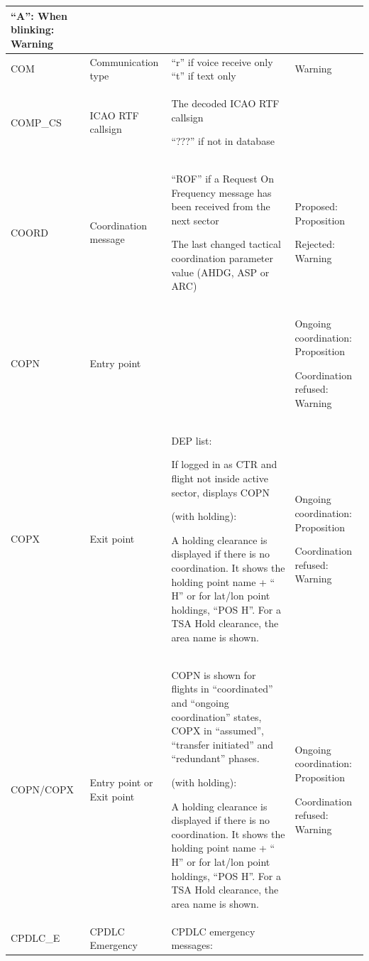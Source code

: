 \documentclass[11pt,a4paper,oldfontcommands]{memoir}
\begin{document}
\begin{landscape}
\begin{longtable}{|p{3cm}|p{4cm}|p{8cm}|p{6cm}|}
      \bigskip
      
      “A”: When blinking: Warning \\ \hline
    COM &
      Communication type &
      “r” if voice receive only “t” if text only &
      Warning \\ \hline
    COMP\_CS &
      ICAO RTF callsign &
      The decoded ICAO RTF callsign 
      
      “???” if not in database &
       \\ \hline
    COORD &
      Coordination message &
      “ROF” if a Request On Frequency  message has been received from  the next sector  
      \bigskip

      The last changed tactical  coordination parameter value (AHDG, ASP or ARC) &
      Proposed: Proposition 
      
      Rejected: Warning \\ \hline
    COPN &
      Entry point &
       &
      Ongoing coordination:  Proposition 
      
      Coordination refused: Warning \\ \hline
    COPX &
      Exit point &
      DEP list: 
      
      If logged in as CTR and flight not inside active sector, displays COPN 
      \bigskip

      (with holding): 
      
      A holding clearance is displayed if  there is no coordination. It shows  the holding point name + “ H” or for  lat/lon point holdings, “POS H”. For a TSA Hold clearance, the area  name is shown. &
      Ongoing coordination: Proposition 
      
      Coordination refused: Warning \\ \hline
    COPN/COPX &
      Entry point or Exit point &
      COPN is shown for flights in  “coordinated” and “ongoing coordination” states, COPX in “assumed”, “transfer  initiated” and “redundant” phases. 
      \bigskip

      (with holding): 
      
      A holding clearance is displayed if  there is no coordination. It shows  the holding point name + “ H” or for  lat/lon point holdings, “POS H”. For a TSA Hold clearance, the area  name is shown. &
      Ongoing coordination:  Proposition 
      
      Coordination refused: Warning \\ \hline
    CPDLC\_E &
      CPDLC Emergency &
      CPDLC emergency messages: 
      

\end{longtable}
\end{landscape}
\end{document}
